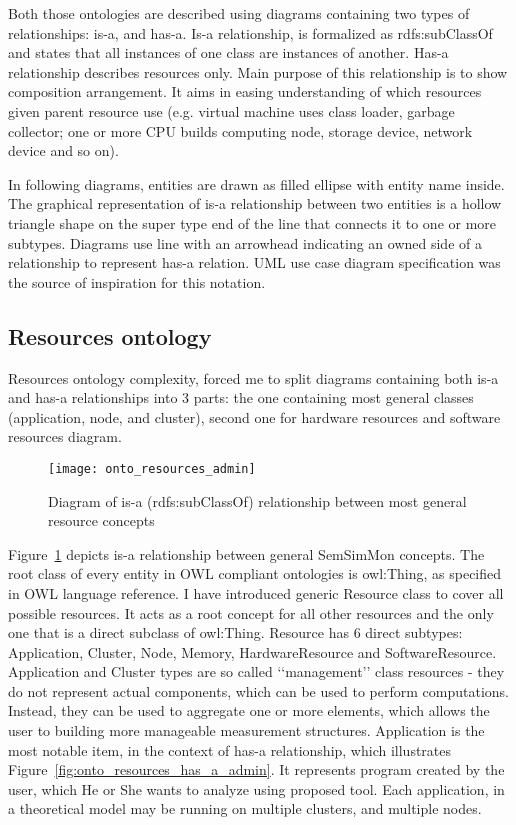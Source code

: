 Both those ontologies are described using diagrams containing two types of relationships: is-a, and has-a. Is-a relationship, is formalized as rdfs:subClassOf and states that all instances of one class are instances of another\cite{rdfRef:2004}. Has-a relationship describes resources only. Main purpose of this relationship is to show composition arrangement. It aims in easing understanding of which resources given parent resource use (e.g. virtual machine uses class loader, garbage collector; one or more CPU builds computing node, storage device, network device and so on).

In following diagrams, entities are drawn as filled ellipse with entity name inside. The graphical representation of is-a relationship between two entities is a hollow triangle shape on the super type end of the line that connects it to one or more subtypes. Diagrams use line with an arrowhead indicating an owned side of a relationship to represent has-a relation. UML use case diagram specification was the source of inspiration for this notation.

\pagebreak

\subsection{Resources ontology}
\label{subsec:arch_knowledge_resources}

Resources ontology complexity, forced me to split diagrams containing both is-a and has-a relationships into 3 parts: the one containing most general classes (application, node, and cluster), second one for hardware resources and software resources diagram. 

\begin{figure}[ht]
\centering
\texttt{[image: onto\_resources\_admin]}
\caption{Diagram of is-a (rdfs:subClassOf) relationship between most general resource concepts}
\label{fig:onto_resources_admin}
\end{figure}

Figure~\ref{fig:onto_resources_admin} depicts is-a relationship between general SemSimMon concepts. The root class of every entity in OWL compliant ontologies is owl:Thing, as specified in OWL language reference\cite{owlRef:2004}. I have introduced generic Resource class to cover all possible resources. It acts as a root concept for all other resources and the only one that is a direct subclass of owl:Thing. Resource has 6 direct subtypes: Application, Cluster, Node, Memory, HardwareResource and SoftwareResource. Application and Cluster types are so called \lq\lq{}management\rq\rq{} class resources - they do not represent actual components, which can be used to perform computations. Instead, they can be used to aggregate one or more elements, which allows the user to building more manageable measurement structures. Application is the most notable item, in the context of has-a relationship, which illustrates Figure~\ref{fig:onto_resources_has_a_admin}. It represents program created by the user, which He or She wants to analyze using proposed tool. Each application, in a theoretical model may be running on multiple clusters, and multiple nodes.

